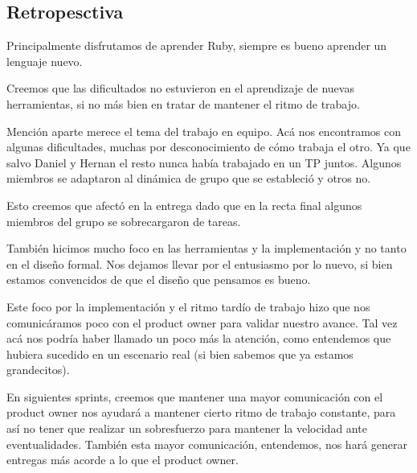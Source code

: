 \subsection{Retropesctiva}
Principalmente disfrutamos de aprender Ruby, siempre es bueno aprender un lenguaje nuevo.

Creemos que las dificultados no estuvieron en el aprendizaje de nuevas herramientas, si no más bien en tratar de mantener el ritmo de trabajo.

Mención aparte merece el tema del trabajo en equipo. Acá nos encontramos con algunas dificultades, muchas por desconocimiento de cómo trabaja el otro. Ya que salvo Daniel y Hernan el resto nunca había trabajado en un TP juntos. Algunos miembros se adaptaron al dinámica de grupo que se estableció y otros no. 

Esto creemos que afectó en la entrega dado que en la recta final algunos miembros del grupo se sobrecargaron de tareas.

También hicimos mucho foco en las herramientas y la implementación y no tanto en el diseño formal. Nos dejamos llevar por el entusiasmo por lo nuevo, si bien estamos convencidos de que el diseño que pensamos es bueno.

Este foco por la implementación y el ritmo tardío de trabajo hizo que nos comunicáramos poco con el product owner para validar nuestro avance. Tal vez acá nos podría haber llamado un poco más la atención, como entendemos que hubiera sucedido en un escenario real (si bien sabemos que ya estamos grandecitos).

En siguientes sprints, creemos que mantener una mayor comunicación con el product owner nos ayudará a mantener cierto ritmo de trabajo constante, para así no tener que realizar un sobresfuerzo para mantener la velocidad ante eventualidades. También esta mayor comunicación, entendemos, nos hará generar entregas más acorde a lo que el product owner. 



